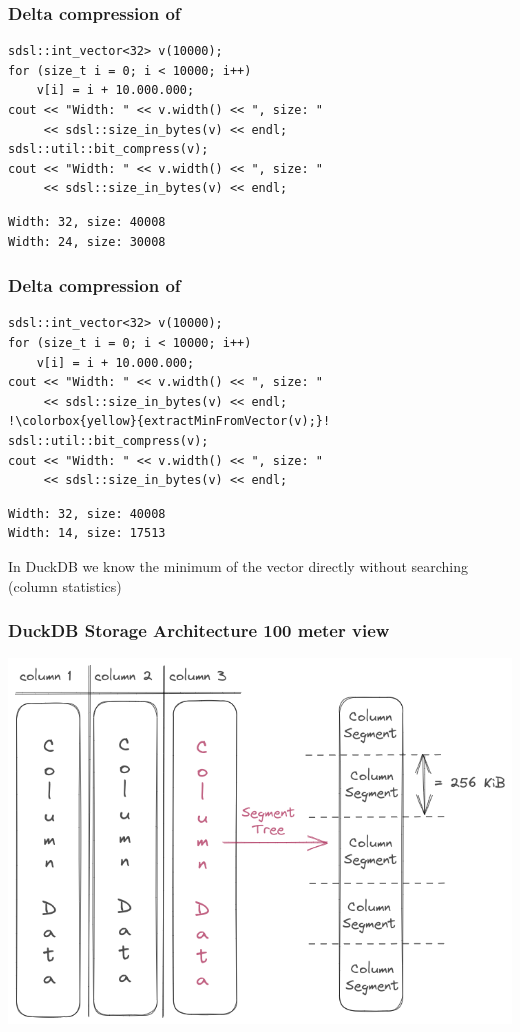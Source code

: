 \documentclass{beamer}
\begin{document}
\begin{frame}[fragile]
    \frametitle{Delta compression of }

\begin{lstlisting}[style=C++]
sdsl::int_vector<32> v(10000);
for (size_t i = 0; i < 10000; i++) 
    v[i] = i + 10.000.000;
cout << "Width: " << v.width() << ", size: " 
     << sdsl::size_in_bytes(v) << endl;
sdsl::util::bit_compress(v);
cout << "Width: " << v.width() << ", size: " 
     << sdsl::size_in_bytes(v) << endl;
\end{lstlisting}

\begin{lstlisting}[style=shell]
Width: 32, size: 40008
Width: 24, size: 30008
\end{lstlisting}
\end{frame}


\begin{frame}[fragile]
    \frametitle{Delta compression of }
\begin{lstlisting}[style=C++,escapechar=!]
sdsl::int_vector<32> v(10000);
for (size_t i = 0; i < 10000; i++) 
    v[i] = i + 10.000.000;
cout << "Width: " << v.width() << ", size: " 
     << sdsl::size_in_bytes(v) << endl;
!\colorbox{yellow}{extractMinFromVector(v);}!
sdsl::util::bit_compress(v);
cout << "Width: " << v.width() << ", size: " 
     << sdsl::size_in_bytes(v) << endl;
\end{lstlisting}

\begin{lstlisting}[style=shell]
Width: 32, size: 40008
Width: 14, size: 17513
\end{lstlisting}

\pause
In DuckDB we know the minimum of the vector directly without searching (column statistics)
\end{frame}


\begin{frame}
    \frametitle{DuckDB Storage Architecture 100 meter view}
    \includegraphics[width=\framewidth]{figures/excalidraw/duckdb-high-level-storage-arch.png}
\end{frame}
\end{document}
